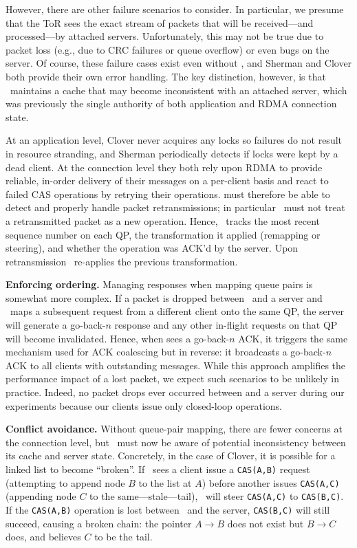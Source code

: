 However, there are other failure scenarios to consider.  In
particular, we presume that the ToR sees the exact stream of packets
that will be received---and processed---by attached servers.
Unfortunately, this may not be true due to packet loss (e.g., due to
CRC failures or queue overflow) or even bugs on the server.  Of
course, these failure cases exist even without \sword, and Sherman and
Clover both provide their own error handling.  The key distinction,
however, is that \sword\ maintains a cache that may become
inconsistent with an attached server, which was previously the single
authority of both application and RDMA connection state.


At an application level, Clover never acquires any locks so failures
do not result in resource stranding, and Sherman periodically detects
if locks were kept by a dead client.  At the connection level they
both rely upon RDMA to provide reliable, in-order delivery of their
messages on a per-client basis and react to failed CAS operations by
retrying their operations.  {\sword} must therefore be able to detect
and properly handle packet retransmissions; in particular \sword\ must
not treat a retransmitted packet as a new operation.  Hence,
\sword\ tracks the most recent sequence number on each QP, the
transformation it applied (remapping or steering), and whether the
operation was ACK'd by the server.  Upon retransmission
\sword\ re-applies the previous transformation.


\textbf{Enforcing ordering.}
Managing responses when mapping queue pairs is somewhat more complex.  If a
packet is dropped between \sword\ and a server and \sword\ maps a subsequent
request from a different client onto the same QP, the server will generate a
go-back-$n$ response and any other in-flight requests on that QP will become
invalidated.  Hence, when {\sword} sees a go-back-$n$ ACK, it triggers the same
mechanism used for ACK coalescing but in reverse: it broadcasts a go-back-$n$
ACK to all clients with outstanding messages.  While this approach amplifies the
performance impact of a lost packet, we expect such scenarios to be unlikely in
practice.  Indeed, no packet drops ever occurred between {\sword} and a server
during our experiments because our clients issue only closed-loop operations.

\textbf{Conflict avoidance.} Without queue-pair mapping, there are
fewer concerns at the connection level, but \sword\ must now be aware
of potential inconsistency between its cache and server state.
Concretely, in the case of Clover, it is possible for a linked list to
become ``broken''.  If \sword\ sees a client issue a \texttt{CAS(A,B)}
request (attempting to append node $B$ to the list at $A$) before
another issues \texttt{CAS(A,C)} (appending node $C$ to the
same---stale---tail), \sword\ will steer \texttt{CAS(A,C)} to
\texttt{CAS(B,C)}. If the \texttt{CAS(A,B)} operation is lost between
\sword\ and the server, \texttt{CAS(B,C)} will still succeed, causing
a broken chain: the pointer $A\rightarrow B$ does not exist but
$B\rightarrow C$ does, and {\sword} believes $C$ to be the tail.


